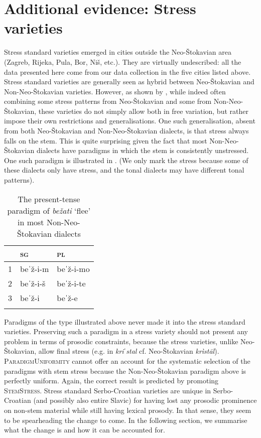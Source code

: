 \documentclass[output=paper,modfonts,nonflat
]{langsci/langscibook}
\begin{document}
\section{Additional evidence: Stress varieties} \label{sec:kager:4}
Stress standard varieties emerged in cities outside the Neo-Štokavian area (Zagreb, Rijeka, Pula, Bor, Niš, etc.). They are virtually undescribed: all the data presented here come from our data collection in the five cities listed above. 
Stress standard varieties are generally seen as hybrid between Neo-Štokavian and Non-Neo-Štokavian varieties. However, as shown by \citet{SimonovicKager2017}, while indeed often combining some stress patterns from Neo-Štokavian and some from Non-Neo-Štokavian, these varieties do not simply allow both in free variation, but rather impose their own restrictions and generalisations. One such generalisation, absent from both Neo-Štokavian and Non-Neo-Štokavian dialects, is that stress always falls on the stem. This is quite surprising given the fact that most Non-Neo-Štokavian dialects have paradigms in which the stem is consistently unstressed. One such paradigm is illustrated in  . (We only mark the stress because some of these dialects only have stress, and the tonal dialects may have different tonal patterns).

\begin{table}
\caption{The present-tense paradigm of \textit{bežati} `flee' in most Non-Neo-Štokavian dialects}
\label{tab:kager:10}
 \begin{tabular}{ l  l  l }
  \lsptoprule
& \textsc{sg}  & \textsc{pl} \\ 
 \midrule
 1  &  beˈž-i-m  &   beˈž-i-mo \\
2  &  beˈž-i-š  & beˈž-i-te \\
3  &  beˈž-i & beˈž-e \\
  \lspbottomrule
 \end{tabular}
\end{table}

Paradigms of the type illustrated above never made it into the stress standard varieties. Preserving such a paradigm in a stress variety should not present any problem in terms of prosodic constraints, because the stress varieties, unlike Neo-Štokavian, allow final stress (e.g. in \textit{kriˈstal} cf. Neo-Štokavian \textit{krìstāl}). \textsc{ParadigmUniformity} cannot offer an account for the systematic selection of the paradigms with stem stress because the Non-Neo-Štokavian paradigm above is perfectly uniform. Again, the correct result is predicted by promoting \textsc{StemStress}. Stress standard Serbo-Croatian varieties are unique in Serbo-Croatian (and possibly also entire Slavic) for having lost any prosodic prominence on non-stem material while still having lexical prosody. In that sense, they seem to be spearheading the change to come.
In the following section, we summarise what the change is and how it can be accounted for.
\end{document}
